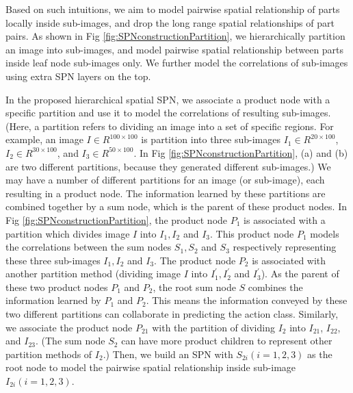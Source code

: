 \documentclass[journal]{IEEEtran}
\begin{document}
Based on such intuitions, we aim to model pairwise spatial relationship of parts locally inside sub-images, and drop the long range spatial relationships of part pairs. As shown in Fig \ref{fig:SPNconstructionPartition}, we hierarchically partition an image into sub-images, and model pairwise spatial relationship between parts inside leaf node sub-images only.  We further model the correlations of sub-images using extra SPN layers on the top. 







In the proposed hierarchical spatial SPN, we associate a product node with a specific partition and use it to model the correlations of resulting sub-images. (Here, a partition refers to dividing an image into a set of specific regions. For example, an image $ I \in R^{100\times100} $ is partition into three sub-images $ I_1 \in R^{20 \times100} $, $ I_2 \in R^{30 \times100} $, and $ I_3 \in R^{50 \times100} $. In Fig \ref{fig:SPNconstructionPartition}, (a) and (b) are two different partitions, because they generated different sub-images.) We may have a number of different partitions for an image (or sub-image), each resulting in a product node.
The information learned by these partitions are combined together by a sum node, which is the parent of  these product nodes.
In Fig \ref{fig:SPNconstructionPartition}, the product node $ P_1 $ is associated with a partition which divides image $ I $ into $ I_1, I_2 $ and $ I_3 $. This product node $ P_1 $ models the correlations between the sum nodes $ S_1, S_2$ and $ S_3 $ respectively representing these three sub-images $ I_1, I_2 $ and $ I_3 $. The product node $ P_2 $ is associated with another partition method (dividing image $ I $ into $ I_1^{'}, I_2^{'} $ and $ I_3^{'} $).
As the parent of these two product nodes $ P_1 $ and $ P_2 $, the root sum node $ S $ combines the information learned by $ P_1 $ and $ P_2 $. This means the information conveyed by these two different partitions can collaborate in predicting the action class. Similarly, we associate the product node $ P_{21} $ with the partition of dividing $ I_2 $ into $ I_{21} $, $ I_{22} $, and $ I_{23} $. (The sum node $ S_2 $ can have more product children to represent other partition methods of $ I_2 $.) Then, we build an SPN with $ S_{2i} (i=1,2,3)$ as the root node to model the pairwise spatial relationship inside sub-image $ I_{2i} (i=1,2,3)$.
\end{document}
